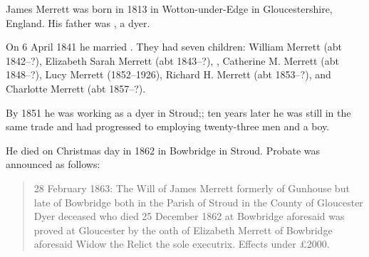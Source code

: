 
James Merrett\cite{HH-MMM-marriage} was born in 1813 in Wotton-under-Edge in Gloucestershire, England.
His father was , a dyer.\cite{MerrettCoppinMarriageCert}

On 6 April 1841 he married .\cite{PeterKarpinski_2016-04-04,MerrettCoppinMarriageCert}
They had seven children: William Merrett (abt 1842--?), Elizabeth Sarah Merrett (abt 1843--?), , Catherine M. Merrett (abt 1848--?), Lucy Merrett (1852--1926), Richard H. Merrett (abt 1853--?), and Charlotte Merrett (abt 1857--?). 

By 1851 he was working as a dyer in Stroud;\cite{Census1851Merrett}; ten years later he was still in the same trade and had progressed to employing twenty-three men and a boy.\cite{Census1861Merrett}

He died on Christmas day in 1862 in Bowbridge in Stroud. Probate was announced as follows:\cite{JamesMerrettProbate}

\begin{quotation}
28 February 1863: The Will of James Merrett formerly of Gunhouse but late of Bowbridge both in the Parish of Stroud in the County of Gloucester Dyer deceased who died 25 December 1862 at Bowbridge aforesaid was proved at Gloucester by the oath of Elizabeth Merrett of Bowbridge aforesaid Widow the Relict the sole executrix. Effects under \pounds2000.
\end{quotation}
